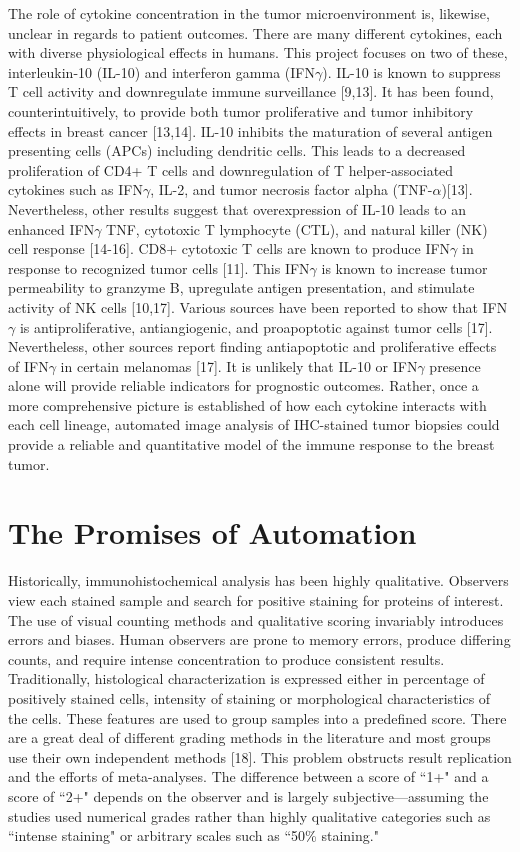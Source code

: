 \documentclass[12pt]{article}
\begin{document}
The role of cytokine concentration in the tumor microenvironment is, likewise, unclear in regards to patient outcomes. There are many different cytokines, each with diverse physiological effects in humans. This project focuses on two of these, interleukin-10 (IL-10) and interferon gamma (IFN$\gamma$). IL-10 is known to suppress T cell activity and downregulate immune surveillance [9,13]. It has been found, counterintuitively, to provide both tumor proliferative and tumor inhibitory effects in breast cancer [13,14]. IL-10 inhibits the maturation of several antigen presenting cells (APCs) including dendritic cells. This leads to a decreased proliferation of CD4+ T cells and downregulation of T helper-associated cytokines such as IFN$\gamma$, IL-2, and tumor necrosis factor alpha (TNF-$\alpha$)[13]. Nevertheless, other results suggest that overexpression of IL-10 leads to an enhanced IFN$\gamma$ TNF, cytotoxic T lymphocyte (CTL), and natural killer (NK) cell response [14-16]. CD8+ cytotoxic T cells are known to produce IFN$\gamma$ in response to recognized tumor cells [11]. This IFN$\gamma$ is known to increase tumor permeability to granzyme B, upregulate antigen presentation, and stimulate activity of NK cells [10,17]. Various sources have been reported to show that IFN$\gamma$ is antiproliferative, antiangiogenic, and proapoptotic against tumor cells [17]. Nevertheless, other sources report finding antiapoptotic and proliferative effects of IFN$\gamma$ in certain melanomas [17]. It is unlikely that IL-10 or IFN$\gamma$ presence alone will provide reliable indicators for prognostic outcomes. Rather, once a more comprehensive picture is established of how each cytokine interacts with each cell lineage, automated image analysis of IHC-stained tumor biopsies could provide a reliable and quantitative model of the immune response to the breast tumor.


\section*{The Promises of Automation}

Historically, immunohistochemical analysis has been highly qualitative. Observers view each stained sample and search for positive staining for proteins of interest. The use of visual counting methods and qualitative scoring invariably introduces errors and biases. Human observers are prone to memory errors, produce differing counts, and require intense concentration to produce consistent results. Traditionally, histological characterization is expressed either in percentage of positively stained cells, intensity of staining or morphological characteristics of the cells. These features are used to group samples into a predefined score. There are a great deal of different grading methods in the literature and most groups use their own independent methods [18]. This problem obstructs result replication and the efforts of meta-analyses. The difference between a score of ``1+" and a score of ``2+" depends on the observer and is largely subjective---assuming the studies used numerical grades rather than highly qualitative categories such as ``intense staining" or arbitrary scales such as ``50\% staining."
\end{document}
